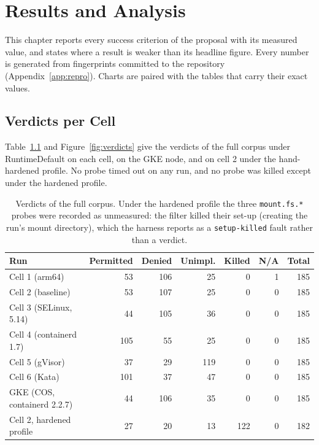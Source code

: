 \chapter{Results and Analysis}
\label{ch:results}

This chapter reports every success criterion of the proposal with its measured value, and states where a result is weaker than its headline figure. Every number is generated from fingerprints committed to the repository (Appendix~\ref{app:repro}). Charts are paired with the tables that carry their exact values.

\section{Verdicts per Cell}
\label{sec:res-verdicts}

Table~\ref{tab:verdicts} and Figure~\ref{fig:verdicts} give the verdicts of the full corpus under RuntimeDefault on each cell, on the GKE node, and on cell 2 under the hand-hardened profile. No probe timed out on any run, and no probe was killed except under the hardened profile.

\begin{table}[htbp]
\centering\small
\begin{tabular}{@{}lrrrrrr@{}}
\toprule
\textbf{Run} & \textbf{Permitted} & \textbf{Denied} & \textbf{Unimpl.} & \textbf{Killed} & \textbf{N/A} & \textbf{Total} \\
\midrule
Cell 1 (arm64) & 53 & 106 & 25 & 0 & 1 & 185 \\
Cell 2 (baseline) & 53 & 107 & 25 & 0 & 0 & 185 \\
Cell 3 (SELinux, 5.14) & 44 & 105 & 36 & 0 & 0 & 185 \\
Cell 4 (containerd 1.7) & 105 & 55 & 25 & 0 & 0 & 185 \\
Cell 5 (gVisor) & 37 & 29 & 119 & 0 & 0 & 185 \\
Cell 6 (Kata) & 101 & 37 & 47 & 0 & 0 & 185 \\
GKE (COS, containerd 2.2.7) & 44 & 106 & 35 & 0 & 0 & 185 \\
Cell 2, hardened profile & 27 & 20 & 13 & 122 & 0 & 182 \\
\bottomrule
\end{tabular}
\caption{Verdicts of the full corpus. Under the hardened profile the three \texttt{mount.fs.*} probes were recorded as unmeasured: the filter killed their set-up (creating the run's mount directory), which the harness reports as a \texttt{setup-killed} fault rather than a verdict.}
\label{tab:verdicts}
\end{table}

